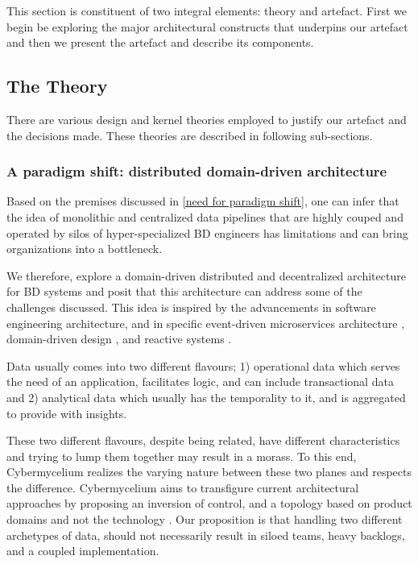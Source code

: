 \documentclass[review]{elsarticle}
\begin{document}
This section is constituent of two integral elements: theory and artefact. First we begin be exploring the major architectural constructs that underpins our artefact and then we present the artefact and describe its components.

\subsection{The Theory}

There are various design and kernel theories employed to justify our artefact and the decisions made. These theories are described in following sub-sections.

\subsubsection{A paradigm shift: distributed domain-driven architecture}

Based on the premises discussed in \ref{need for paradigm shift}, one can infer that the idea of monolithic and centralized data pipelines that are highly couped and operated by silos of hyper-specialized BD engineers has limitations and can bring organizations into a bottleneck.

We therefore, explore a domain-driven distributed and decentralized architecture for BD systems and posit that this architecture can address some of the challenges discussed. This idea is inspired by the advancements in software engineering architecture, and in specific event-driven microservices architecture \cite{EventDrivenMicroServices}, domain-driven design \cite{evans2004domain}, and reactive systems \cite{aceto2007reactive}.

Data usually comes into two different flavours; 1) operational data which serves the need of an application, facilitates logic, and can include transactional data and 2) analytical data which usually has the temporality to it, and is aggregated to provide with insights.

These two different flavours, despite being related, have different characteristics and trying to lump them together may result in a morass. To this end, Cybermycelium realizes the varying nature between these two planes and respects the difference. Cybermycelium aims to transfigure current architectural approaches by proposing an inversion of control, and a topology based on product domains and not the technology \cite{dataMeshArticle}. Our proposition is that handling two different archetypes of data, should not necessarily result in siloed teams, heavy backlogs, and a coupled implementation.
\end{document}
